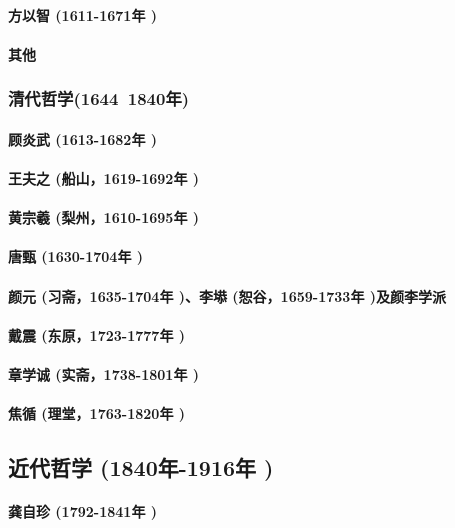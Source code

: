 \documentclass[UTF8]{../RepresentationUniverse}
\begin{document}
        \paragraph{方以智 (1611-1671年 )}
        \paragraph{其他}

    \subsubsection{清代哲学(1644~1840年)}
        \paragraph{顾炎武 (1613-1682年 )}
        \paragraph{王夫之 (船山，1619-1692年 )}
        \paragraph{黄宗羲 (梨州，1610-1695年 )}
        \paragraph{唐甄 (1630-1704年 )}
        \paragraph{颜元 (习斋，1635-1704年 )、李塨 (恕谷，1659-1733年 )及颜李学派}
        \paragraph{戴震 (东原，1723-1777年 )}
        \paragraph{章学诚 (实斋，1738-1801年 )}
        \paragraph{焦循 (理堂，1763-1820年 )}
    
\subsection{近代哲学 (1840年-1916年 )}
    \paragraph{龚自珍 (1792-1841年 )}
\end{document}

